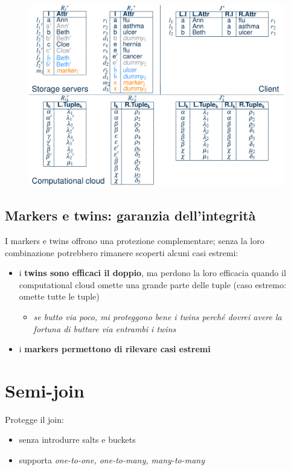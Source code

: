 \documentclass{report}
\begin{document}
\begin{figure}[H]
    \centering
    \includegraphics[width=1\linewidth]{images/join-execution.png}
\end{figure}

\subsection{Markers e twins: garanzia dell'integrità}

I markers e twins offrono una protezione complementare; senza la loro combinazione potrebbero 
rimanere scoperti alcuni casi estremi:
\begin{itemize}
    \item i \textbf{twins sono efficaci il doppio}, ma perdono la loro efficacia quando il computational cloud 
    omette una grande parte delle tuple (caso estremo: omette tutte le tuple)
    \begin{itemize}
        \item \textit{se butto via poco, mi proteggono bene i twins perché dovrei avere la fortuna di buttare via entrambi i twins}
    \end{itemize}
    \item i \textbf{markers permettono di rilevare casi estremi}
\end{itemize}

\section{Semi-join}
Protegge il join:
\begin{itemize}
    \item senza introdurre salts e buckets 
    \item supporta \textit{one-to-one, one-to-many, many-to-many}
\end{itemize}
\end{document}
